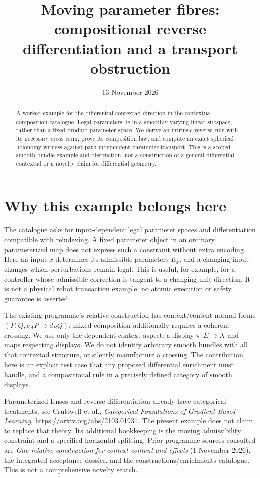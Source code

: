 \documentclass[11pt]{article}
\title{Moving parameter fibres: compositional reverse differentiation and a transport obstruction}
\author{}\date{13 November 2026}
\begin{document}
\maketitle
\begin{abstract}
A worked example for the differential-contextad direction in the contextual-composition catalogue. Legal parameters lie in a smoothly varying linear subspace, rather than a fixed product parameter space. We derive an intrinsic reverse rule with its necessary cross term, prove its composition law, and compute an exact spherical holonomy witness against path-independent parameter transport. This is a scoped smooth-bundle example and obstruction, not a construction of a general differential contextad or a novelty claim for differential geometry.
\end{abstract}
\section{Why this example belongs here}
The catalogue asks for input-dependent legal parameter spaces and differentiation compatible with reindexing. A fixed parameter object in an ordinary parameterized map does not express such a constraint without extra encoding. Here an input $x$ determines its admissible parameters $E_x$, and a changing input changes which perturbations remain legal. This is useful, for example, for a controller whose admissible correction is tangent to a changing unit direction. It is not a physical robot transaction example: no atomic execution or safety guarantee is asserted.

The existing programme's relative construction has context/content normal forms $(P,Q,e_AP\to d_BQ)$; mixed composition additionally requires a coherent crossing. We use only the dependent-context aspect: a display $\pi:E\to X$ and maps respecting displays. We do not identify arbitrary smooth bundles with all that contextad structure, or silently manufacture a crossing. The contribution here is an explicit test case that any proposed differential enrichment must handle, and a compositional rule in a precisely defined category of smooth displays.

Parameterized lenses and reverse differentiation already have categorical treatments; see Cruttwell et al., \emph{Categorical Foundations of Gradient-Based Learning}, \url{https://arxiv.org/abs/2103.01931}. The present example does not claim to replace that theory. Its additional bookkeeping is the moving admissibility constraint and a specified horizontal splitting. Prior programme sources consulted are \emph{One relative construction for context content and effects} (1 November 2026), the integrated acceptance dossier, and the constructions/enrichments catalogue. This is not a comprehensive novelty search.
\end{document}
